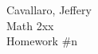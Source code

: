 \documentclass[letterpaper,12pt,fleqn]{article}
\begin{document}
Cavallaro, Jeffery \\
Math 2xx \\
Homework \#n

\bigskip

\begin{enumerate}
\end{enumerate}
\end{document}
